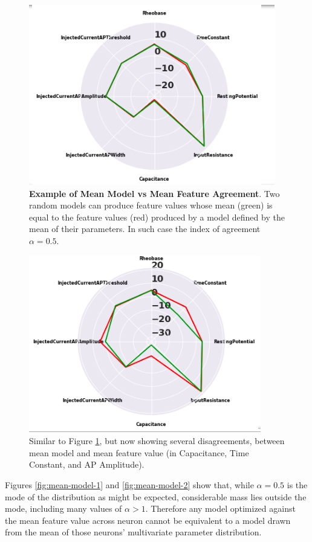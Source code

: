 \begin{figure}
    \centering
    \includegraphics{figures/model_similarities.png}
    \caption[Example of Mean Model vs Mean Feature Agreement]{\textbf{Example of Mean Model vs Mean Feature Agreement}.
    Two random models can produce feature values whose mean (green) is equal to the feature values (red) produced by a model defined by the mean of their parameters.
    In such case the index of agreement $\alpha=0.5$.}
    \label{fig:mean-model-3}
\end{figure}

\begin{figure}
    \centering
    \includegraphics{figures/model_differences.png}
    \caption[Example of Mean Model vs Mean Feature Disagreement]{Similar to Figure \ref{fig:mean-model-3}, but now showing several disagreements, between mean model and mean feature value (in Capacitance, Time Constant, and AP Amplitude).}
    \label{fig:mean-model-4}
\end{figure}

Figures \ref{fig:mean-model-1} and \ref{fig:mean-model-2} show that, while $\alpha=0.5$ is the mode of the distribution as might be expected, considerable mass lies outside the mode, including many values of $\alpha>1$.
Therefore any model optimized against the mean feature value across neuron cannot be equivalent to a model drawn from the mean of those neurons' multivariate parameter distribution.

